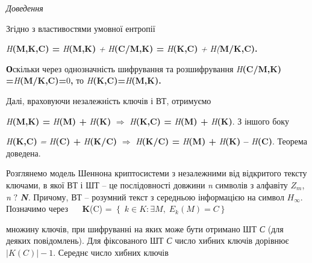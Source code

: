 \documentclass[a4paper]{article}
\newcounter{}
\begin{document}
{\itshape
Доведення }

\textit{ }Згідно\textit{ }з властивостями умовної ентропії 

\textit{H}\textbf{(}\textbf{M}\textbf{,}\textbf{K}\textbf{,}\textbf{C}\textbf{)
= }\textit{H}\textbf{(}\textbf{M}\textbf{,}\textbf{K}\textbf{) }\textit{+
}\textit{H}\textbf{(}\textbf{C}\textbf{/}\textbf{M}\textbf{,}\textbf{K}\textbf{)
= }\textit{H}\textbf{(}\textbf{K}\textbf{,}\textbf{C}\textbf{) }\textit{+
}\textit{H}\textit{(}\textbf{M}\textbf{/}\textbf{K}\textbf{,}\textbf{C}\textbf{).
}

\textbf{О}скільки через однозначність шифрування та розшифрування 
\textit{H}\textbf{(}\textbf{C}\textbf{/}\textbf{M}\textbf{,}\textbf{K}\textbf{)
=}\textit{H}\textbf{(}\textbf{M}\textbf{/}\textbf{K}\textbf{,}\textbf{C}\textbf{)=}0\textbf{,
}то\textbf{
}\textit{H}\textbf{(}\textbf{K}\textbf{,}\textbf{C}\textbf{)=}\textit{H}\textbf{(}\textbf{M}\textbf{,}\textbf{K}\textbf{)}\textbf{.}\textbf{
}

Далі, враховуючи незалежність ключів і ВТ, отримуємо  \textbf{ }

\textit{H}\textbf{(}\textbf{M}\textbf{,}\textbf{K}\textbf{) =
}\textit{H}\textbf{(}\textbf{M}\textbf{) +
}\textit{H}\textbf{(}\textbf{K}\textbf{) } ${\Rightarrow }$\textit{
}\textit{H}\textbf{(}\textbf{K}\textbf{,}\textbf{C}\textbf{) =
}\textit{H}\textbf{(}\textbf{M}\textbf{) +
}\textit{H}\textbf{(}\textbf{K}\textbf{)}. З іншого боку

\textit{H}\textbf{(}\textbf{K}\textbf{,}\textbf{C}\textbf{) }\textit{=
}\textit{H}\textbf{(}\textbf{C}\textbf{) +
}\textit{H}\textbf{(}\textbf{K}\textbf{/}\textbf{C}\textbf{) } ${\Rightarrow
}$\textbf{ }\textit{H}\textbf{(}\textbf{K}\textbf{/}\textbf{C}\textbf{) =
}\textit{H}\textbf{(}\textbf{M}\textbf{) +
}\textit{H}\textbf{(}\textbf{K}\textbf{) –
}\textit{H}\textbf{(}\textbf{C}\textbf{)}.\textbf{ }Теорема\textbf{ }доведена.

Розглянемо модель Шеннона  криптосистеми  з незалежними  від відкритого тексту
ключами, в якої ВТ і ШТ – це послідовності довжини  \textit{n}\textit{ }
символів з алфавіту   ${Z_{{m}}}$,  \textit{n} ${?}$\textit{
}\textbf{\textit{N}}\textit{.}  Причому,  ВТ – розумний текст з середньою
інформацією на символ  ${H_{{\infty }}}$.  Позначимо  через   $ $   $ $ $ $ $ $
 \textbf{K}(C) =   ${\left\{\;k\in K:\exists
M,\;E_{k}\right.(M)=C\left.\right\}}$

множину ключів, при шифруванні на яких  може бути отримано ШТ  \textit{С} (для
деяких повідомлень). Для фіксованого ШТ  \textit{С}  число хибних ключів
дорівнює   ${|K(C)|-1}$. Середнє число хибних ключів 
\end{document}
